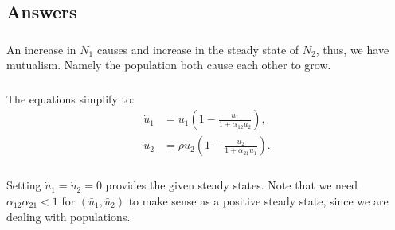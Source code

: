 \documentclass[]{article}
\renewcommand{\l}{\left(}
\renewcommand{\r}{\right)}
\begin{document}
\begin{Answ}
\subsection{Answers}
\subsubsection{}
An increase in $N_1$ causes and increase in the steady state of $N_2$, thus, we have mutualism. Namely the population both cause each other to grow.
\subsubsection{}
The equations simplify to:
\begin{align}
\dot{u}_1&=u_1\l 1-\frac{u_1}{1+\alpha_{12}u_2}\r,\\
\dot{u}_2&=\rho u_2\l 1-\frac{u_2}{1+\alpha_{21}u_1}\r.
\end{align}
\subsubsection{}
Setting $\dot{u}_1=\dot{u}_2=0$ provides the given steady states. Note that we need $\alpha_{12}\alpha_{21}<1$ for $(\bar{u}_1,\bar{u}_2)$ to make sense as a positive steady state, since we are dealing with populations.

\end{Answ}
\end{document}
